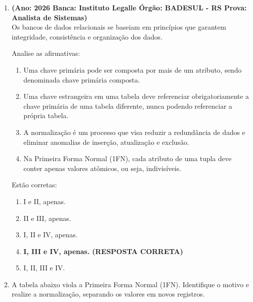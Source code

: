 \documentclass[12pt,a4paper]{article}
\begin{document}
\begin{enumerate}
    \item \textbf{(Ano: 2026 Banca: Instituto Legalle Órgão: BADESUL - RS Prova: Analista de Sistemas)} \\
    Os bancos de dados relacionais se baseiam em princípios que garantem integridade, consistência e organização dos dados.
    
    Analise as afirmativas:
    
    \begin{enumerate}[label=\Roman*.]
        \item Uma chave primária pode ser composta por mais de um atributo, sendo denominada chave primária composta.
        \item Uma chave estrangeira em uma tabela deve referenciar obrigatoriamente a chave primária de uma tabela diferente, nunca podendo referenciar a própria tabela.
        \item A normalização é um processo que visa reduzir a redundância de dados e eliminar anomalias de inserção, atualização e exclusão.
        \item Na Primeira Forma Normal (1FN), cada atributo de uma tupla deve conter apenas valores atômicos, ou seja, indivisíveis.
    \end{enumerate}
    
    Estão corretas:
    
    \begin{enumerate}[label=\Alph*)]
        \item I e II, apenas.
        \item II e III, apenas.
        \item I, II e IV, apenas.
        \item \textbf{I, III e IV, apenas. (RESPOSTA CORRETA)}
        \item I, II, III e IV.
    \end{enumerate}

    \item A tabela abaixo viola a Primeira Forma Normal (1FN). Identifique o motivo e realize a normalização, separando os valores em novos registros.
    

\end{enumerate}
\end{document}
